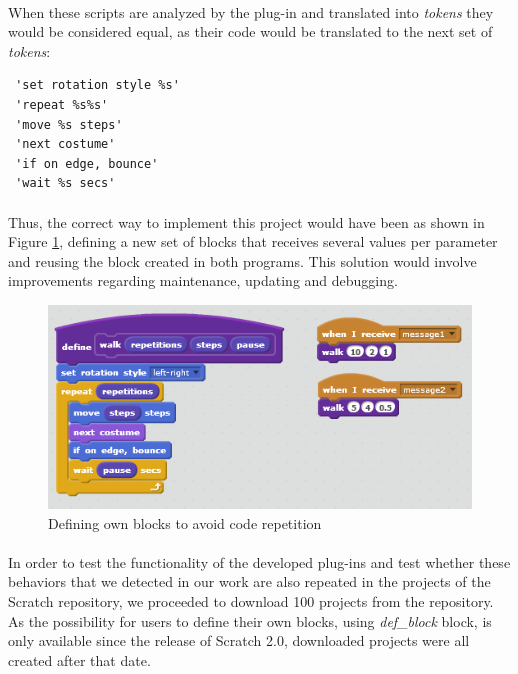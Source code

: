 \documentclass[a4paper,10pt]{article}
\begin{document}
\paragraph{}When these scripts are analyzed by the plug-in and translated into \textit{tokens} they would be considered equal, as their code would be translated to the next set of \textit{tokens}:
\begin{verbatim}
 'set rotation style %s'
 'repeat %s%s'
 'move %s steps'
 'next costume'
 'if on edge, bounce'
 'wait %s secs'
\end{verbatim}
\paragraph{}Thus, the correct way to implement this project would have been as shown in Figure \ref{fig:CodeRepetition2}, defining a new set of blocks that receives several values per parameter and reusing the block created in both programs. This solution would involve improvements regarding maintenance, updating and debugging.

\begin{figure}
  \centering
    \includegraphics{img/CodeRepetition2.png}
  \caption{Defining own blocks to avoid code repetition}
  \label{fig:CodeRepetition2}
\end{figure}

\paragraph{}In order to test the functionality of the developed plug-ins and test whether these behaviors that we detected in our work are also repeated in the projects of the Scratch repository, we proceeded to download 100 projects from the repository. As the possibility for users to define their own blocks, using \textit{def\_block} block, is only available since the release of Scratch 2.0, downloaded projects were all created after that date.
\end{document}
